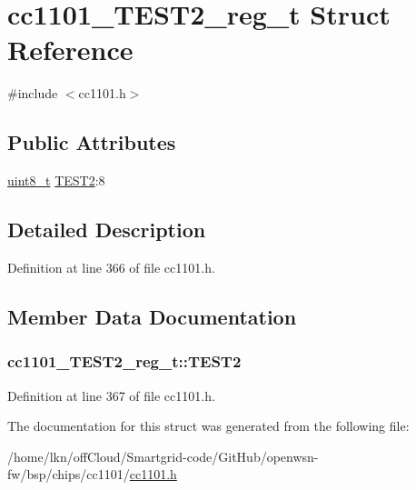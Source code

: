 \hypertarget{structcc1101___t_e_s_t2__reg__t}{}\section{cc1101\+\_\+\+T\+E\+S\+T2\+\_\+reg\+\_\+t Struct Reference}
\label{structcc1101___t_e_s_t2__reg__t}


{\ttfamily \#include $<$cc1101.\+h$>$}

\subsection*{Public Attributes}
\begin{DoxyCompactItemize}
\item 
\hyperlink{_p_e___types_8h_aba7bc1797add20fe3efdf37ced1182c5}{uint8\+\_\+t} \hyperlink{structcc1101___t_e_s_t2__reg__t_a544649ed07d03d5bf6bbbb61826e65e2}{T\+E\+S\+T2}\+:8
\end{DoxyCompactItemize}


\subsection{Detailed Description}


Definition at line 366 of file cc1101.\+h.



\subsection{Member Data Documentation}
\subsubsection[{\texorpdfstring{T\+E\+S\+T2}{TEST2}}]{ cc1101\+\_\+\+T\+E\+S\+T2\+\_\+reg\+\_\+t\+::\+T\+E\+S\+T2}\hypertarget{structcc1101___t_e_s_t2__reg__t_a544649ed07d03d5bf6bbbb61826e65e2}{}\label{structcc1101___t_e_s_t2__reg__t_a544649ed07d03d5bf6bbbb61826e65e2}


Definition at line 367 of file cc1101.\+h.



The documentation for this struct was generated from the following file\+:\begin{DoxyCompactItemize}
\item 
/home/lkn/off\+Cloud/\+Smartgrid-\/code/\+Git\+Hub/openwsn-\/fw/bsp/chips/cc1101/\hyperlink{cc1101_8h}{cc1101.\+h}\end{DoxyCompactItemize}

